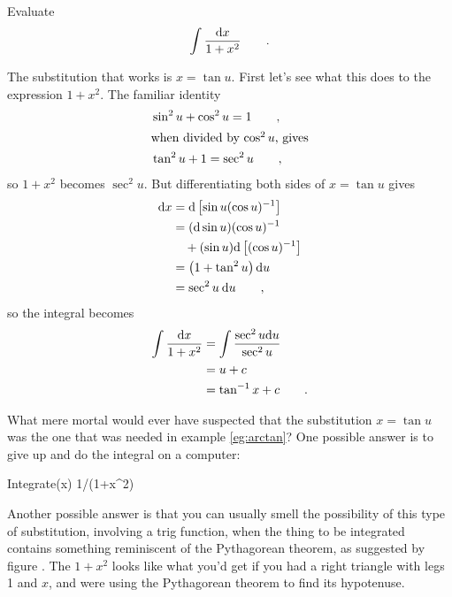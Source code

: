 \begin{eg}\label{eg:arctan}
\egquestion Evaluate
\begin{equation*}
  \int \frac{\textup{d} x}{1+x^2} \qquad .
\end{equation*}

\eganswer The substitution that works is $x=\tan u$. First let's see what this does
to the expression $1+x^2$. The familiar identity
\begin{align*}
   &\sin^2 u + \cos^2 u = 1 \qquad ,\\
\intertext{when divided by $\cos^2 u$, gives}
   &\tan^2 u + 1 = \sec^2 u \qquad ,
\end{align*}
so $1+x^2$ becomes $\sec^2 u$.
But differentiating both sides of $x=\tan u$ gives
\begin{align*}
  \textup{d} x &= \textup{d} \left[\sin u(\cos u)^{-1}\right] \\
         &= (\textup{d}\sin u)(\cos u)^{-1}\\
         &  \quad +(\sin u)\textup{d}\left[(\cos u)^{-1}\right] \\
         &= \left(1+\tan^2 u\right)\textup{d} u \\
         &= \sec^2 u\:\textup{d} u \qquad , 
\end{align*}
so the integral becomes
\begin{align*}
  \int \frac{\textup{d} x}{1+x^2} &= \int \frac{\sec^2 u \textup{d} u}{\sec^2 u} \\
           &= u+c \\
           &= \tan^{-1} x+c \qquad .
\end{align*}
\end{eg}
%
What mere mortal would ever have suspected that the substitution $x=\tan u$ was
the one that was needed in example \ref{eg:arctan}? One possible answer is to
give up and do the integral on a computer:

\begin{Code}
  \ii Integrate(x) 1/(1+x^2)
\end{Code}

Another possible answer is that you can usually smell the possibility of
this type of substitution, involving a trig function, when the thing to be
integrated contains something reminiscent of the Pythagorean theorem, as
suggested by figure . The $1+x^2$ looks like what
you'd get if you had a right triangle with legs 1 and $x$, and were using the
Pythagorean theorem to find its hypotenuse.
%

